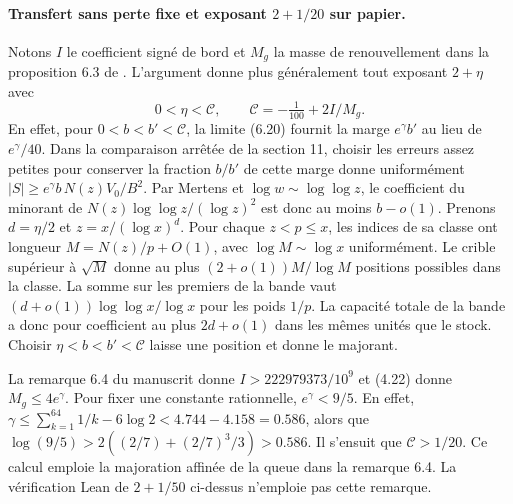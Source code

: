 \documentclass[11pt,a4paper]{article}
\begin{document}
\paragraph{Transfert sans perte fixe et exposant $2+1/20$ sur papier.}
Notons $I$ le coefficient signé de bord et $M_g$ la masse de
renouvellement dans la proposition 6.3 de \cite{survivors}.
L'argument donne plus généralement tout exposant $2+\eta$ avec
\[
                 0<\eta<\mathcal C,\qquad
                 \mathcal C=-\tfrac1{100}+2I/M_g .
\]
En effet, pour $0<b<b'<\mathcal C$, la limite (6.20) fournit la
marge $e^\gamma b'$ au lieu de $e^\gamma/40$. Dans la comparaison
arrêtée de la section 11, choisir les erreurs assez petites pour
conserver la fraction $b/b'$ de cette marge donne uniformément
$|S|\ge e^\gamma b\,N(z)V_0/B^2$. Par Mertens et
$\log w\sim\log\log z$, le coefficient du minorant de
$N(z)\log\log z/(\log z)^2$ est donc au moins $b-o(1)$.
Prenons $d=\eta/2$ et $z=x/(\log x)^d$. Pour chaque $z<p\le x$,
les indices de sa classe ont longueur $M=N(z)/p+O(1)$, avec
$\log M\sim\log x$ uniformément. Le crible supérieur à $\sqrt M$
donne au plus $(2+o(1))M/\log M$ positions possibles dans la classe.
La somme sur les premiers de la bande vaut
$(d+o(1))\log\log x/\log x$ pour les poids $1/p$.
La capacité totale de la bande a donc pour coefficient au plus
$2d+o(1)$ dans les mêmes unités que le stock. Choisir
$\eta<b<b'<\mathcal C$ laisse une position et donne le majorant.

La remarque 6.4 du manuscrit donne $I>222979373/10^9$ et (4.22)
donne $M_g\le4e^\gamma$. Pour fixer une constante rationnelle,
$e^\gamma<9/5$. En effet,
$\gamma\le\sum_{k=1}^{64}1/k-6\log 2<4.744-4.158=0.586$,
alors que $\log(9/5)>2((2/7)+(2/7)^3/3)>0.586$.
Il s'ensuit que $\mathcal C>1/20$. Ce calcul emploie la majoration
affinée de la queue dans la remarque 6.4. La vérification Lean de
$2+1/50$ ci-dessus n'emploie pas cette remarque.
\end{document}
